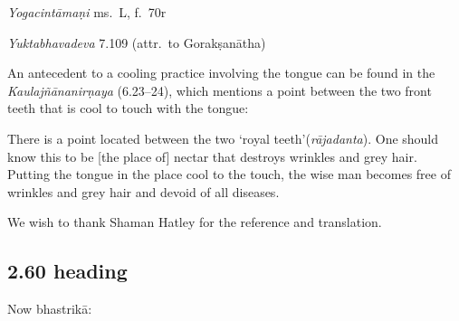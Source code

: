 \begin{ekdosis}
\begin{testimonia}[hp02_059]
\emph{Yogacintāmaṇi} ms.~L, f.~70r

\begin{versinnote}
\end{versinnote}

\emph{Yuktabhavadeva} 7.109 (attr.~to Gorakṣanātha)
\begin{versinnote}
\end{versinnote}

\end{testimonia}

\begin{philcomm}[hp02_059]
An antecedent to a cooling practice involving the tongue can be found in the \emph{Kaulajñānanirṇaya} (6.23–24), which mentions a point between the two front teeth that is cool to touch with the tongue:

\begin{versinnote}
There is a point located between the two ‘royal teeth’(\emph{rājadanta}). One should know this to be [the place of] nectar that destroys wrinkles and grey hair. Putting the tongue in the place cool to the touch, the wise man becomes free of wrinkles and grey hair and devoid of all diseases.
\end{versinnote}
We wish to thank Shaman Hatley for the reference and translation.
\end{philcomm}

\subsection*{2.60 heading}
\begin{translation}[hp02_060a]
Now bhastrikā:
\end{translation}


\end{ekdosis}
